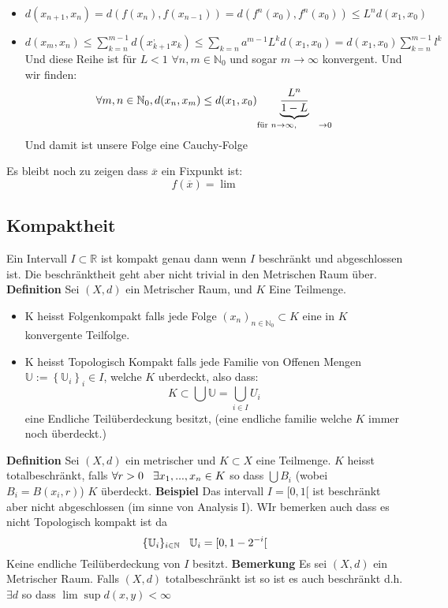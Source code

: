 \documentclass{article}
\newcommand{\mspc}{\hspace{0.7cm}}
\newcommand{\smspc}{\hspace{0.3cm}}
\begin{document}
\begin{itemize}
  \item{$d(x_{n+1},x_n)=d(f(x_n),f(x_{n-1}))=d(f^n(x_0),f^n(x_0))\le L^nd(x_1,x_0)$}
  \item{$d(x_m,x_n)\le \sum_{k=n}^{m-1}d(x_{k+1}^,x_k)\le\sum_{k=n}a^{m-1}L^kd(x_1,x_0)=d(x_1,x_0)\sum_{k=n}^{m-1}l^k$ Und diese Reihe ist für $L<1$ $\forall n,m\in \mathbb{N}_0$ und sogar $m\rightarrow\infty$ konvergent.
  Und wir finden:\[\forall m,n\in\mathbb{N}_0, d(x_n,x_m)\le d(x_1,x_0)\underset{\text{für }n\rightarrow\infty,\mspc \rightarrow0}{\underbrace{\frac{L^n}{1-L}}} \]Und damit ist unsere Folge eine Cauchy-Folge }
\end{itemize}
Es bleibt noch zu zeigen dass $\overline{x}$ ein Fixpunkt ist:
\[f(\overline{x})=\lim_{}\]
\subsection{Kompaktheit} Ein Intervall $I\subset\mathbb{R}$ ist kompakt genau dann wenn $I$ beschränkt und abgeschlossen ist. Die beschränktheit geht aber nicht trivial in den Metrischen Raum über.
\newline\textbf{Definition} Sei $(X,d)$ ein Metrischer Raum, und $K$ Eine Teilmenge.\begin{itemize}
  \item{K heisst Folgenkompakt falls jede Folge $(x_n)_{n\in\mathbb{N}_0}\subset K$ eine in $K$ konvergente Teilfolge.}
\item{K heisst Topologisch Kompakt falls jede Familie von Offenen Mengen $\mathbb{U}:=\left\lbrace\mathbb{U}_i\right\rbrace_i\in I$, welche $K$ uberdeckt, also dass:\[K\subset\bigcup\mathbb{U}=\bigcup_{i\in I}U_i\] eine Endliche Teilüberdeckung besitzt, (eine endliche familie welche $K$ immer noch überdeckt.)}
\end{itemize}
\textbf{Definition} Sei $(X,d)$ ein metrischer und $K\subset X$ eine Teilmenge. $K$ heisst totalbeschränkt, falls $\forall r>0\smspc \exists x_1,...,x_n\in K$ so dass $\bigcup B_i$ (wobei $B_i=B(x_i,r)$) $K$ überdeckt.\newline
\textbf{Beispiel} Das intervall $I=[0,1[$ ist beschränkt aber nicht abgeschlossen (im sinne von Analysis I). WIr bemerken auch dass es nicht Topologisch kompakt ist da\[\lbrace\mathbb{U}_i\rbrace_{i\in\mathbb{N}}\smspc \mathbb{U}_i=[0,1-2^{-i}[ \] Keine endliche Teilüberdeckung von $I$ besitzt.\newline
\textbf{Bemerkung} Es sei $(X,d)$ ein Metrischer Raum. Falls $(X,d)$ totalbeschränkt ist so ist es auch beschränkt d.h. $\exists d$ so dass $\lim \sup d(x,y)<\infty$\newline
\end{document}
